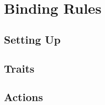 \section*{Binding Rules}

\begin{multicols}{2}

\subsection*{Setting Up}





\subsection*{Traits}





\end{multicols}

\mentalSkillChart

\begin{multicols}{2}

\subsection*{Actions}








\end{multicols}

\physicalSkillChart

